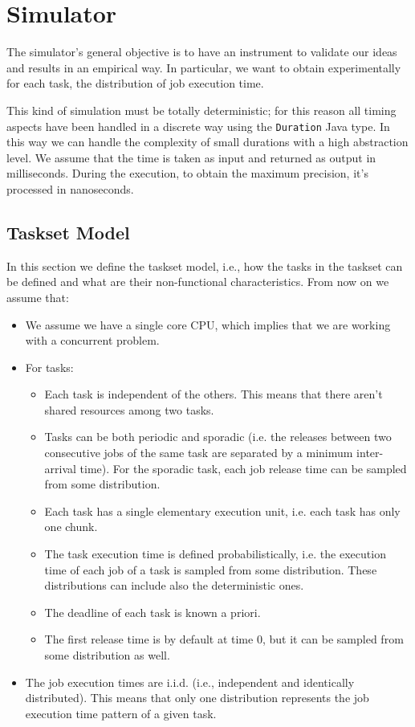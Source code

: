 \chapter{Simulator}
The simulator's general objective is to have an instrument to validate our ideas and results in an empirical way. In particular, we want to obtain experimentally for each task, the distribution of job execution time.

This kind of simulation must be totally deterministic; for this reason all timing aspects have been handled in a discrete way using the \texttt{Duration} Java type. In this way we can handle the complexity of small durations with a high abstraction level. We assume that the time is taken as input and returned as output in milliseconds. During the execution, to obtain the maximum precision, it's processed in nanoseconds.


\section{Taskset Model}
\label{sec:simulator_task_model}
In this section we define the taskset model, i.e., how the tasks in the taskset can be defined and what are their non-functional characteristics.
From now on we assume that:
\begin{itemize}
    \item We assume we have a single core CPU, which implies that we are working with a concurrent problem.
    \item For tasks:
    \begin{itemize}
        \item Each task is independent of the others. This means that there aren't shared resources among two tasks.
        \item Tasks can be both periodic and sporadic (i.e. the releases between two consecutive jobs of the same task are separated by a minimum inter-arrival time). For the sporadic task, each job release time can be sampled from some distribution.
        \item Each task has a single elementary execution unit, i.e. each task has only one chunk.
        \item The task execution time is defined probabilistically, i.e. the execution time of each job of a task is sampled from some distribution. These distributions can include also the deterministic ones.
        \item The deadline of each task is known a priori.
        \item The first release time is by default at time 0, but it can be sampled from some distribution as well.
    \end{itemize}
    \item The job execution times are i.i.d. (i.e., independent and identically distributed). This means that only one distribution represents the job execution time pattern of a given task.
\end{itemize}

